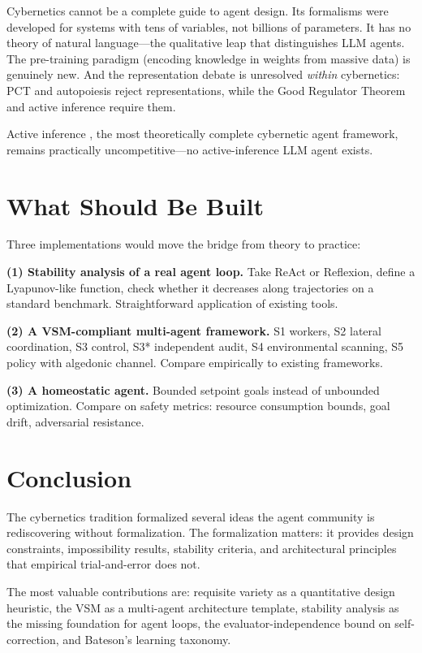\documentclass[11pt]{article}
\begin{document}
Cybernetics cannot be a complete guide to agent design. Its formalisms were developed for systems with tens of variables, not billions of parameters. It has no theory of natural language---the qualitative leap that distinguishes LLM agents. The pre-training paradigm (encoding knowledge in weights from massive data) is genuinely new. And the representation debate is unresolved \emph{within} cybernetics: PCT and autopoiesis reject representations, while the Good Regulator Theorem and active inference require them.

Active inference \cite{friston2010free}, the most theoretically complete cybernetic agent framework, remains practically uncompetitive---no active-inference LLM agent exists.

\section{What Should Be Built}

Three implementations would move the bridge from theory to practice:

\textbf{(1) Stability analysis of a real agent loop.} Take ReAct or Reflexion, define a Lyapunov-like function, check whether it decreases along trajectories on a standard benchmark. Straightforward application of existing tools.

\textbf{(2) A VSM-compliant multi-agent framework.} S1 workers, S2 lateral coordination, S3 control, S3* independent audit, S4 environmental scanning, S5 policy with algedonic channel. Compare empirically to existing frameworks.

\textbf{(3) A homeostatic agent.} Bounded setpoint goals instead of unbounded optimization. Compare on safety metrics: resource consumption bounds, goal drift, adversarial resistance.

\section{Conclusion}

The cybernetics tradition formalized several ideas the agent community is rediscovering without formalization. The formalization matters: it provides design constraints, impossibility results, stability criteria, and architectural principles that empirical trial-and-error does not.

The most valuable contributions are: requisite variety as a quantitative design heuristic, the VSM as a multi-agent architecture template, stability analysis as the missing foundation for agent loops, the evaluator-independence bound on self-correction, and Bateson's learning taxonomy.
\end{document}
